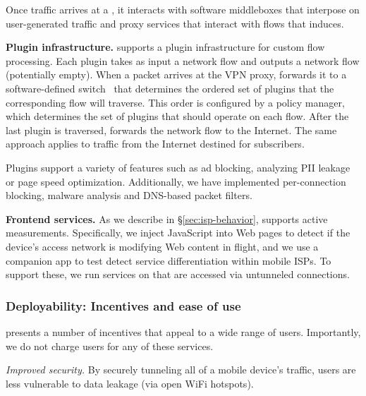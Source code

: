 Once traffic arrives at a \meddlebox, it interacts with software middleboxes that interpose on 
user-generated traffic and proxy services that interact with 
flows that \meddle induces.  

\noindent\textbf{Plugin infrastructure.}
\platname{} supports a plugin
infrastructure for custom flow processing. Each plugin takes as input a 
network flow and outputs a network flow (potentially empty). 
When a packet arrives at the VPN proxy, \meddle forwards it to a software-defined switch~\cite{Openvswitch} that 
determines the ordered set of plugins that the corresponding flow will traverse. 
This order is configured by a policy manager, which determines 
the set of plugins that should operate on each flow. After the last 
plugin is traversed, \meddle forwards the network flow to the Internet. 
The same approach applies to traffic from the Internet destined for \meddle subscribers. 

Plugins support a variety of features such as ad blocking, 
analyzing PII leakage or page speed optimization. Additionally, we have implemented 
per-connection blocking, malware analysis and DNS-based packet filters. 

\noindent\textbf{Frontend services.} As we describe in \S\ref{sec:isp-behavior}, 
\meddle supports active measurements. 
Specifically, we inject JavaScript into Web pages to detect if the device's 
access network is modifying Web content in flight, and we use a companion app to 
test detect service differentiation within mobile ISPs. To support these, we 
run services on \meddle that are accessed via untunneled connections. 

\subsubsection{Deployability: Incentives and ease of use}
\label{subsec:design_deploy}


 \meddle presents a number of incentives 
that appeal to a wide range of users. Importantly, we do not charge users for any of these 
services.

\noindent \emph{Improved security.} By securely tunneling all of a mobile device's traffic, users 
are less vulnerable to data leakage (\eg via open WiFi hotspots). 


